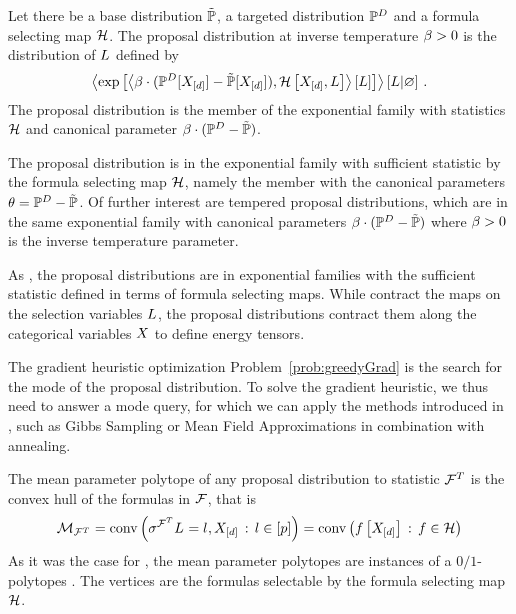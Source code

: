 \begin{definition}
    Let there be a base distribution $\tilde{\mathbb{P}}$, a targeted distribution $\mathbb{P}^{D}$ and a formula selecting map $\mathcal{H}$.
    The proposal distribution at inverse temperature $\beta>0$ is the distribution of $L$ defined by
    \begin{align*}
        \left\langle \mathrm{exp}\left[\left\langle \beta\cdot(\mathbb{P}^{D}[X_{[d]}]-\tilde{\mathbb{P}}[X_{[d]}]),\mathcal{H}\left[X_{[d]},L\right]\right\rangle \left[ L \right]\right] \right\rangle \left[ L | \varnothing \right] \, .
    \end{align*}
    The proposal distribution is the member of the exponential family with statistics $\mathcal{H}$ and canonical parameter $\beta\cdot(\mathbb{P}^{D}-\tilde{\mathbb{P}})$.
\end{definition}


The proposal distribution is in the exponential family with sufficient statistic by the formula selecting map $\mathcal{H}$, namely the member with the canonical parameters $\theta=\mathbb{P}^{D}-\tilde{\mathbb{P}}$.
Of further interest are tempered proposal distributions, which are in the same exponential family with canonical parameters $\beta\cdot(\mathbb{P}^{D}-\tilde{\mathbb{P}})$ where $\beta>0$ is the inverse temperature parameter.

As \MarkovLogicNetworks{}, the proposal distributions are in exponential families with the sufficient statistic defined in terms of formula selecting maps.
While \MarkovLogicNetworks{} contract the maps on the selection variables $L$, the proposal distributions contract them along the categorical variables $X$ to define energy tensors.

The gradient heuristic optimization Problem~\eqref{prob:greedyGrad} is the search for the mode of the proposal distribution.
To solve the gradient heuristic, we thus need to answer a mode query, for which we can apply the methods introduced in , such as Gibbs Sampling or Mean Field Approximations in combination with annealing.


The mean parameter polytope of any proposal distribution to statistic $\mathcal{F}^T$ is the convex hull of the formulas in $\mathcal{F}$, that is
\begin{align*}
    \mathcal{M}_{\mathcal{F}^T}
    = \mathrm{conv}\left(\sigma^{\mathcal{F}^T}{L_{}=l_{},X_{[d]}} \,:\, l\in[p]\right)
    = \mathrm{conv}\left(f\left[X_{[d]}\right] \,:\, f\in\mathcal{H}\right)
\end{align*}
As it was the case for \MarkovLogicNetworks{}, the mean parameter polytopes are instances of a $0/1$-polytopes \cite{ziegler_lectures_2000,gillmann_01-polytopes_2007}.
The vertices are the formulas selectable by the formula selecting map $\mathcal{H}$.

